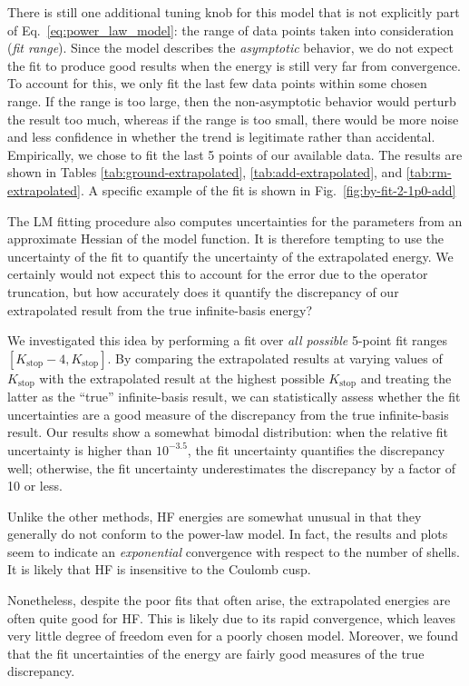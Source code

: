 There is still one additional tuning knob for this model that is not explicitly part of Eq.\ \eqref{eq:power_law_model}: the range of data points taken into consideration (\textit{fit range}).  Since the model describes the \emph{asymptotic} behavior, we do not expect the fit to produce good results when the energy is still very far from convergence.  To account for this, we only fit the last few data points within some chosen range.  If the range is too large, then the non-asymptotic behavior would perturb the result too much, whereas if the range is too small, there would be more noise and less confidence in whether the trend is legitimate rather than accidental.  Empirically, we chose to fit the last 5 points of our available data.  The results are shown in Tables \ref{tab:ground-extrapolated}, \ref{tab:add-extrapolated}, and \ref{tab:rm-extrapolated}.  A specific example of the fit is shown in Fig.\ \ref{fig:by-fit-2-1p0-add}

The LM fitting procedure also computes uncertainties for the parameters from an approximate Hessian of the model function.  It is therefore tempting to use the uncertainty of the fit to quantify the uncertainty of the extrapolated energy.  We certainly would not expect this to account for the error due to the operator truncation, but how accurately does it quantify the discrepancy of our extrapolated result from the true infinite-basis energy?

We investigated this idea by performing a fit over \emph{all possible} 5-point fit ranges $[K_{\text{stop}} - 4, K_{\text{stop}}]$.  By comparing the extrapolated results at varying values of $K_{\text{stop}}$ with the extrapolated result at the highest possible $K_{\text{stop}}$ and treating the latter as the ``true'' infinite-basis result, we can statistically assess whether the fit uncertainties are a good measure of the discrepancy from the true infinite-basis result.  Our results show a somewhat bimodal distribution: when the relative fit uncertainty is higher than $10^{-3.5}$, the fit uncertainty quantifies the discrepancy well; otherwise, the fit uncertainty underestimates the discrepancy by a factor of 10 or less.

Unlike the other methods, HF energies are somewhat unusual in that they generally do not conform to the power-law model.  In fact, the results and plots seem to indicate an \emph{exponential} convergence with respect to the number of shells.  It is likely that HF is insensitive to the Coulomb cusp.

Nonetheless, despite the poor fits that often arise, the extrapolated energies are often quite good for HF.  This is likely due to its rapid convergence, which leaves very little degree of freedom even for a poorly chosen model.  Moreover, we found that the fit uncertainties of the energy are fairly good measures of the true discrepancy.

